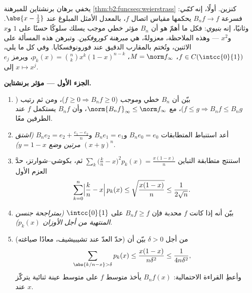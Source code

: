 \begin{problem}\label{pb:b2:funcseq:1}
يخفي برهان برنشتاين للمبرهنة \cref{thm:b2:funcseq:weierstrass} كنزين.
أولًا، إنه \emph{كمّي}: فسرعة $B_nf
\to f$ يحكمها مقياس اتصال $f$، بالمعدل
الأمثل المبلوغ عند $\abs{x - \frac12}$. وثانيًا، إنه
\emph{بنيوي}: فكل ما أهمّ هو أن $B_n$ مؤثر خطي
موجب يسلك سلوكًا حسنًا على $1$ و$x$ و$x^2$ ---
وهذه الملاحظة، معزولةً، هي \emph{مبرهنة
كوروفكين}. وتبرهن هذه المسألة على الاثنين،
وتُختم بالمقارب الدقيق عند فورونوفسكايا. وفي كل ما يلي،
$f \in C(\intcc{0}{1})$، $M = \norm f_\infty$، $p_k(x) = \binom
nk x^k(1-x)^{n-k}$، ويرمز $e_j$ إلى $x \mapsto x^j$.

\medskip
\noindent\textbf{الجزء الأول --- مؤثر برنشتاين.}
\begin{enumerate}
  \item بيّن أن $B_n$ خطي و\emph{موجب} ($f \geq 0
        \Rightarrow B_nf \geq 0$)، ومن ثم رتيب ($f \leq g
        \Rightarrow B_nf \leq B_ng$)، مع
        $\norm{B_nf}_\infty \leq \norm f_\infty$، وأن
        $B_nf$ يستكمل $f$ عند الطرفين معًا.
  \item أعد استنباط المتطابقات $B_n e_0 = e_0$ و$B_n e_1 =
        e_1$ و$B_n e_2 = e_2 + \frac{e_1 - e_2}{n}$
        \emph{(اشتق $(x + y)^n$ مرتين وضع $y = 1 -
        x$)}.
  \item استنتج متطابقة التباين $\sum_k \bigl(\frac kn -
        x\bigr)^2 p_k(x) = \frac{x(1-x)}{n}$ ثم، بكوشي--شوارتز،
        حدَّ العزم الأول
        \[
        \sum_{k=0}^{n}\Bigl|\frac kn - x\Bigr|\,p_k(x)
        \leq \sqrt{\frac{x(1-x)}{n}} \leq \frac{1}{2\sqrt n} .
        \]
  \item بيّن أنه إذا كانت $f$ محدبة فإن $B_nf \geq f$ على
        $\intcc{0}{1}$ \emph{(بمتراجحة جنسن المنتهية من أجل
        الأوزان $p_k(x)$)}.
  \item (حدّ العدّ عند تشيبيشيف، معادًا صياغته) من أجل $\delta > 0$
        بيّن أن
        \[
        \sum_{\abs{k/n - x} > \delta} p_k(x)
        \leq \frac{x(1-x)}{n\delta^2}
        \leq \frac{1}{4n\delta^2} ,
        \]
        وأعطِ القراءة الاحتمالية: $B_nf(x)$ يأخذ متوسط
        $f$ على متوسط عينة ثنائية يتركّز عند $x$.
\end{enumerate}


\end{problem}
